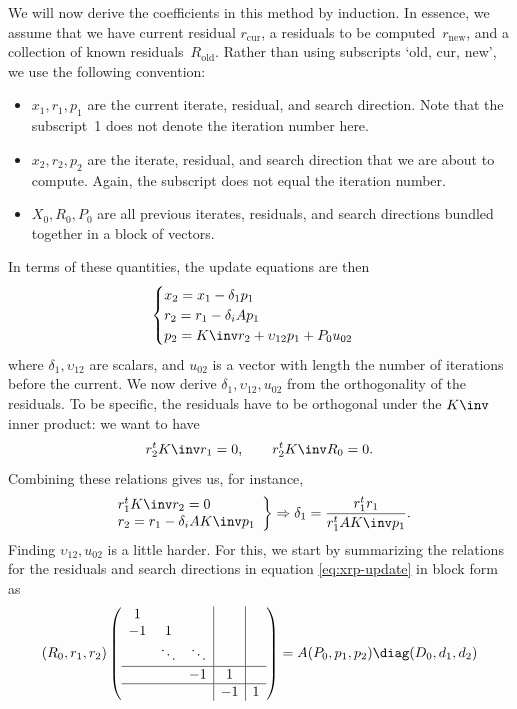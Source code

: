 We will now derive the coefficients in this method by induction. In
essence, we assume that we have current residual $r_{\mathrm{cur}}$, a
residuals to be computed~$r_{\mathrm{new}}$, and a collection of known
residuals~$R_{\mathrm{old}}$. Rather than using subscripts `old, cur,
new', we use the following convention:
\begin{itemize}
\item $x_1,r_1,p_1$ are the current iterate, residual, and search
  direction. Note that the subscript~1 does not denote the iteration
  number here.
\item $x_2,r_2,p_2$ are the iterate, residual, and search direction
  that we are about to compute. Again, the subscript does not equal
  the iteration number.
\item $X_0,R_0,P_0$ are all previous iterates, residuals, and search
  directions bundled together in a block of vectors.
\end{itemize}
In terms of these quantities, the update equations are then
\begin{equation}
\begin{cases}
  x_2=x_1-\delta_1 p_1 \\
  r_2=r_1-\delta_iA p_1 \\
  p_2 = K\inv r_2+\upsilon_{12}p_1+P_0u_{02}
\end{cases}
\label{eq:cg-updates-xrp}
\end{equation}
where $\delta_1,\upsilon_{12}$ are scalars, and $u_{02}$ is a vector with
length the number of iterations before the current. We now derive
$\delta_1,\upsilon_{12},u_{02}$ from the orthogonality of the residuals. To
be specific, the residuals have to be orthogonal under the $K\inv$
inner product: we want to have
\[
  r_2^tK\inv r_1=0,\qquad r_2^tK\inv R_0=0.
\]
Combining these relations gives us, for instance,
\[
  \left.
  \begin{array}{l}
    r_1^tK\inv r_2=0\\   r_2=r_1-\delta_iAK\inv p_1
  \end{array}
  \right\} \Rightarrow
  \delta_1 = \frac{r_1^tr_1}{r_1^tAK\inv p_1}.
\]
Finding $\upsilon_{12},u_{02}$ is a little harder. For this, we start by
summarizing the relations for the residuals and search directions
in equation \eqref{eq:xrp-update} in block
form as 
\[
  (R_0,r_1,r_2) \left(
\begin{array}{r|c|c}
  \begin{matrix}1\\ -1&1\\ &\ddots&\ddots \end{matrix}
  &&\\ \hline -1&1&\\ \hline &-1&1
\end{array}
  \right) = A(P_0,p_1,p_2)\diag(D_0,d_1,d_2)
\]
